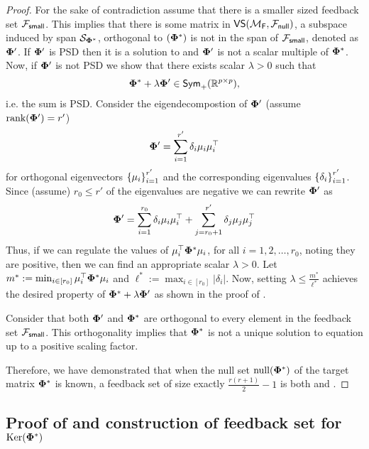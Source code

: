 \begin{proof}
   For the sake of contradiction assume that there is a smaller sized feedback set ${\mathcal{F}}_{\textsf{small}}$. This implies that there is some matrix in $\textsf{VS}({\mathcal{M}}_{\textsf{F}},{\mathcal{F}}_{\textsf{null}})$, a subspace induced by span $\mathcal{S}_{\boldsymbol{\Phi}^*}$, orthogonal to $(\boldsymbol{\Phi}^*)$ is not in the span of ${\mathcal{F}}_{\textsf{small}}$, denoted as $\boldsymbol{\Phi}'$. If $\boldsymbol{\Phi}'$ is PSD then it is a solution to  and $\boldsymbol{\Phi}'$ is not a scalar multiple of $\boldsymbol{\Phi}^*$. Now, if $\boldsymbol{\Phi}'$ is not PSD we show that there exists scalar $\lambda > 0$ such that
    \begin{align*}
        \boldsymbol{\Phi}^* + \lambda \boldsymbol{\Phi}' \in \textsf{Sym}_{+}(\mathbb{R}^{p\times p}),
    \end{align*}
     i.e. the sum is PSD. Consider the eigendecompostion of $\boldsymbol{\Phi}'$ (assume $\text{rank}({\boldsymbol{\Phi}'}) = r'$)
     \begin{align*}
         \boldsymbol{\Phi}' = \sum_{i = 1}^{r'} \delta_i\mu_i\mu_i^{\top}
     \end{align*}
     for orthogonal eigenvectors $\left\{\mu_i\right\}_{i=1}^{r'}$ and the corresponding eigenvalues $\left\{\delta_i\right\}_{i=1}^{r'}$. Since (assume) $r_0 \le r'$ of the eigenvalues are negative we can rewrite $\boldsymbol{\Phi}'$ as
     \begin{align*}
         \boldsymbol{\Phi}' = \sum_{i=1}^{r_0} \delta_i \mu_i\mu_i^{\top} + \sum_{j=r_0 + 1}^{r'} \delta_j \mu_j\mu_j^{\top} 
     \end{align*}
     Thus, if we can regulate the values of $\mu^{\top}_i\boldsymbol{\Phi}^*\mu_i$, for all $i = 1,2,\ldots,r_0$, noting they are positive, then we can find an appropriate scalar $\lambda > 0$. Let $m^* := \min_{i \in [r_0]} \mu_i^{\top}\boldsymbol{\Phi}^*\mu_i$ and $\ell^* := \max_{i \in [r_0]} |\delta_i|$. Now, setting $\lambda \le \frac{m^*}{\ell^*}$ achieves the desired property of $\boldsymbol{\Phi}^* + \lambda \boldsymbol{\Phi}'$ as shown in the proof of . 

     Consider that both $\boldsymbol{\Phi}'$ and $\boldsymbol{\Phi}^*$ are orthogonal to every element in the feedback set ${\mathcal{F}}_{\textsf{small}}$. This orthogonality implies that $\boldsymbol{\Phi}^*$ is not a unique solution to equation  up to a positive scaling factor.

Therefore, we have demonstrated that when the null set $\mathrm{null}({\boldsymbol{\Phi}^*})$ of the target matrix $\boldsymbol{\Phi}^*$ is known, a feedback set of size exactly $\frac{r(r+1)}{2} - 1$ is both  and .
\end{proof}

\subsection{Proof of  and construction of feedback set for \texorpdfstring{$\mathrm{Ker}({\boldsymbol{\Phi}^*})$}{phi*}}


